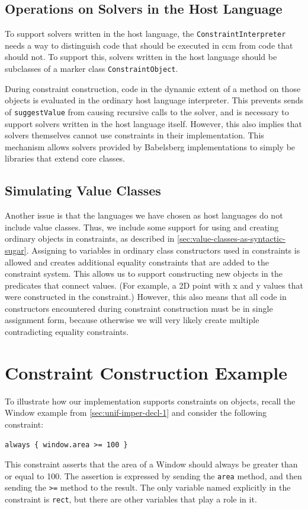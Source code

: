 \subsection*{Operations on Solvers in the Host Language}
\label{sec:solv-host-lang}
To support solvers written in the host language, the
\lstinline{ConstraintInterpreter} needs a way to distinguish code that should be
executed in \acrlong{ccm} from code that should not. To support this, solvers
written in the host language should be subclasses of a marker class
\lstinline{ConstraintObject}.

During constraint construction, code in the dynamic extent of a method on those
objects is evaluated in the ordinary host language interpreter. This prevents
sends of \lstinline{suggestValue} from causing recursive calls to the solver,
and is necessary to support solvers written in the host language
itself. However, this also implies that solvers themselves cannot use
constraints in their implementation. This mechanism allows solvers provided by
Babelsberg implementations to simply be libraries that extend core classes.

\subsection*{Simulating Value Classes}
\label{sec:simul-value-class}
Another issue is that the languages we have chosen as host languages do not
include value classes. Thus, we include some support for using and creating
ordinary objects in constraints, as described in
\autoref{sec:value-classes-as-syntactic-sugar}. Assigning to variables in
ordinary class constructors used in constraints is allowed and creates
additional equality constraints that are added to the constraint system. This
allows us to support constructing new objects in the predicates that connect
values. (For example, a 2D point with x and y values that were constructed in the
constraint.) However, this also means that all code in constructors encountered
during constraint construction must be in single assignment form, because
otherwise we will very likely create multiple contradicting equality
constraints.

\section{Constraint Construction Example}
\label{sec:constraint-construction-example}
To illustrate how our implementation supports constraints on objects, recall the
Window example from \autoref{sec:unif-imper-decl-1} and consider the following
constraint:
\begin{lstlisting}
always { window.area >= 100 }
\end{lstlisting}
This constraint asserts that the area of a Window should always be greater than
or equal to 100. The assertion is expressed by sending the \lstinline{area}
method, and then sending the \lstinline{>=} method to the result.  The only
variable named explicitly in the constraint is \lstinline{rect}, but there are
other variables that play a role in it.

